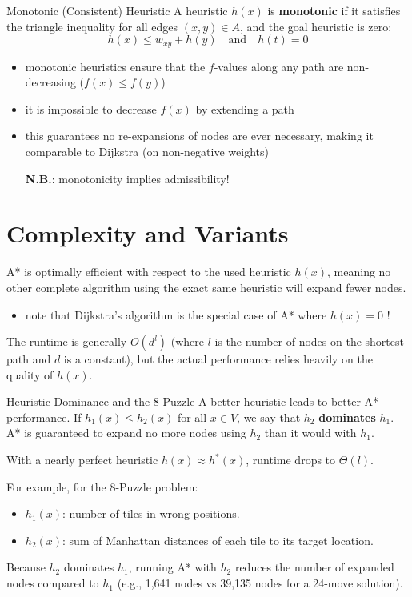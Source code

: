\documentclass[a4paper, 11pt]{report}
\begin{document}
\begin{defframe}{Monotonic (Consistent) Heuristic}{}
    A heuristic $h(x)$ is \textbf{monotonic} if it satisfies the triangle inequality for all edges $(x,y) \in A$, and the goal heuristic is zero:
    $$h(x) \le w_{xy} + h(y) \quad \text{and} \quad h(t) = 0$$
    
    \begin{itemize}
        \item monotonic heuristics ensure that the $f$-values along any path are non-decreasing ($f(x) \le f(y)$)
        \item it is impossible to decrease $f(x)$ by extending a path
        \item this guarantees no re-expansions of nodes are ever necessary, making it comparable to Dijkstra (on non-negative weights)

\begin{gframe}{\textbf{N.B.}: monotonicity implies admissibility!}
\end{gframe}

    \end{itemize}
\end{defframe}

\section{Complexity and Variants}

A* is optimally efficient with respect to the used heuristic $h(x)$, meaning no other complete algorithm using the exact same heuristic will expand fewer nodes. 
\begin{itemize}
    \item note that Dijkstra's algorithm is the special case of A* where $h(x) = 0$ !
\end{itemize}

The runtime is generally $O(d^l)$ (where $l$ is the number of nodes on the shortest path and $d$ is a constant), but the actual performance relies heavily on the quality of $h(x)$.

\begin{gframe}{Heuristic Dominance and the 8-Puzzle}
    A better heuristic leads to better A* performance. If $h_1(x) \le h_2(x)$ for all $x \in V$, we say that $h_2$ \textbf{dominates} $h_1$. A* is guaranteed to expand no more nodes using $h_2$ than it would with $h_1$.

    With a nearly perfect heuristic $h(x) \approx h^*(x)$, runtime drops to $\Theta(l)$.
    
    For example, for the 8-Puzzle problem:
    \begin{itemize}
        \item $h_1(x)$: number of tiles in wrong positions.
        \item $h_2(x)$: sum of Manhattan distances of each tile to its target location.
    \end{itemize}
    Because $h_2$ dominates $h_1$, running A* with $h_2$ reduces the number of expanded nodes compared to $h_1$ (e.g., 1,641 nodes vs 39,135 nodes for a 24-move solution).
\end{gframe}
\end{document}
